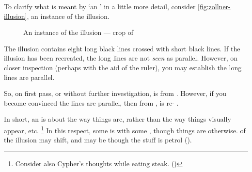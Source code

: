   \begin{note}
    \nocite{Scriven:1962vq}%
    \nocite{Woodward:2021ue}%
    \nocite{Perry:1979vc}%
    \nocite{Perry:1986aa}%
    \nocite{Collins:1997wn}%
    To clarify what is meant by `an \agpe{}' in a little more detail, consider \autoref{fig:zollner-illusion}, an instance of the \citeauthor{Zollner:1860vx} illusion.

    \begin{figure}[!h]
      \centering
      \def\svgwidth{\columnwidth}
      
      \caption{An instance of the \citeauthor{Zollner:1860vx} illusion --- crop of ~\textcite{Fibonacci:2007vj}}
      \label{fig:zollner-illusion}
    \end{figure}

    \noindent%
    The \citeauthor{Zollner:1860vx} illusion contains eight long black lines crossed with short black lines.
    If the illusion has been recreated, the long lines are not \emph{seen} as parallel.
    However, on closer inspection (perhaps with the aid of the ruler), you may establish the long lines are parallel.

    So, on first pass, or without further investigation,  is \evaled{}  from .
    However, if you become convinced the lines are parallel, then from ,  is re-\evaled{} .

    In short, an \agpe{} is about the way things are, rather than the way things visually appear, etc.%
    \footnote{
      Consider also Cypher's thoughts while eating steak. (\cite[330--331]{Wachowski:2000uh})
    }
    In this respect, some  is  with some , though things are otherwise.
     of the \citeauthor{Zollner:1860vx} illusion may shift, and  may be \evaled{}  though the stuff is petrol  (\cite[cf.][18]{Williams:1979wi}).
  \end{note}



